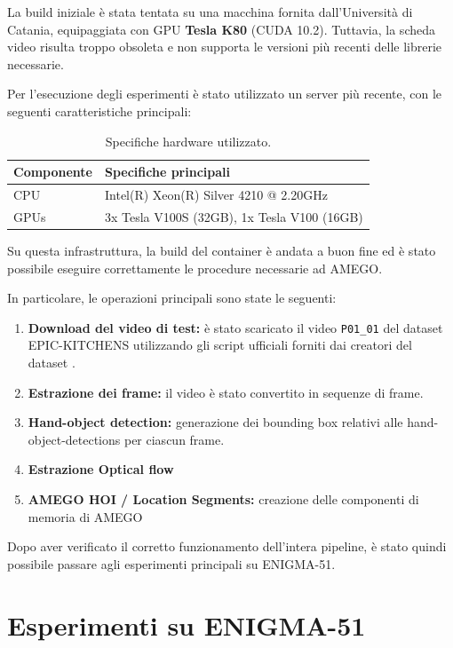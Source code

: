La build iniziale è stata tentata su una macchina fornita dall'Università di Catania, equipaggiata con GPU \textbf{Tesla K80} (CUDA 10.2). Tuttavia, la scheda video risulta troppo obsoleta e non supporta le versioni più recenti delle librerie necessarie.

Per l'esecuzione degli esperimenti è stato utilizzato un server più recente, con le seguenti caratteristiche principali:

\begin{table}[H]
    \centering
    \begin{tabular}{ll}
        \hline
        \textbf{Componente} & \textbf{Specifiche principali} \\
        \hline
        CPU & Intel(R) Xeon(R) Silver 4210 @ 2.20GHz \\
        GPUs & 3x Tesla V100S (32GB), 1x Tesla V100 (16GB) \\
        \hline
    \end{tabular}
    \caption{Specifiche hardware utilizzato.}
\end{table}


Su questa infrastruttura, la build del container è andata a buon fine ed è stato possibile eseguire correttamente le procedure necessarie ad AMEGO.  

In particolare, le operazioni principali sono state le seguenti:
\begin{enumerate}
    \item \textbf{Download del video di test:} è stato scaricato il video \texttt{P01\_01} del dataset EPIC-KITCHENS \cite{Damen2021PAMI} utilizzando gli script ufficiali forniti dai creatori del dataset \cite{epic_download_scripts}.
    \item \textbf{Estrazione dei frame:} il video è stato convertito in sequenze di frame.
    \item \textbf{Hand-object detection:} generazione dei bounding box relativi alle hand-object-detections per ciascun frame.
    \item \textbf{Estrazione Optical flow}
    \item \textbf{AMEGO HOI / Location Segments:} creazione delle componenti di memoria di AMEGO
\end{enumerate}

Dopo aver verificato il corretto funzionamento dell'intera pipeline, è stato quindi possibile passare agli esperimenti principali su ENIGMA-51.

\section{Esperimenti su ENIGMA-51}

